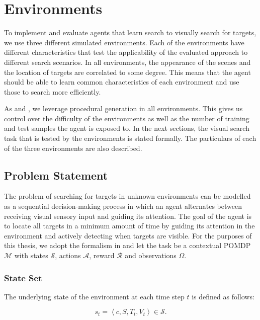 \section{Environments}
\label{sec:environments}

To implement and evaluate agents that learn search to visually search for targets, we use three different simulated environments.
Each of the environments have different characteristics that test the applicability of the evaluated approach to different search scenarios.
In all environments, the appearance of the scenes and the location of targets are correlated to some degree.
This means that the agent should be able to learn common characteristics of each environment and use those to search more efficiently.

As \cite{cobbe_leveraging_2020} and \cite{mnih_asynchronous_2016}, we leverage procedural generation in all environments.
This gives us control over the difficulty of the environments as well as the number of training and test samples the agent is exposed to.
In the next sections, the visual search task that is tested by the environments is stated formally.
The particulars of each of the three environments are also described.

\subsection{Problem Statement}

The problem of searching for targets in unknown environments can be modelled as a sequential decision-making process in which an agent alternates between receiving visual sensory input and guiding its attention.
The goal of the agent is to locate all targets in a minimum amount of time by guiding its attention in the environment and actively detecting when targets are visible.
For the purposes of this thesis, we adopt the formalism in \cite{kirk_survey_2022} and let the task be a contextual POMDP \(\mathcal{M}\) with states \(\mathcal{S}\), actions \(\mathcal{A}\), reward \(\mathcal{R}\) and observations \(\Omega\).

\subsubsection{State Set}

The underlying state of the environment at each time step \(t\) is defined as follows:

\begin{equation}
    s_t = \left\langle c, S, T_t, V_t \right\rangle \in \mathcal{S}.
\end{equation}

